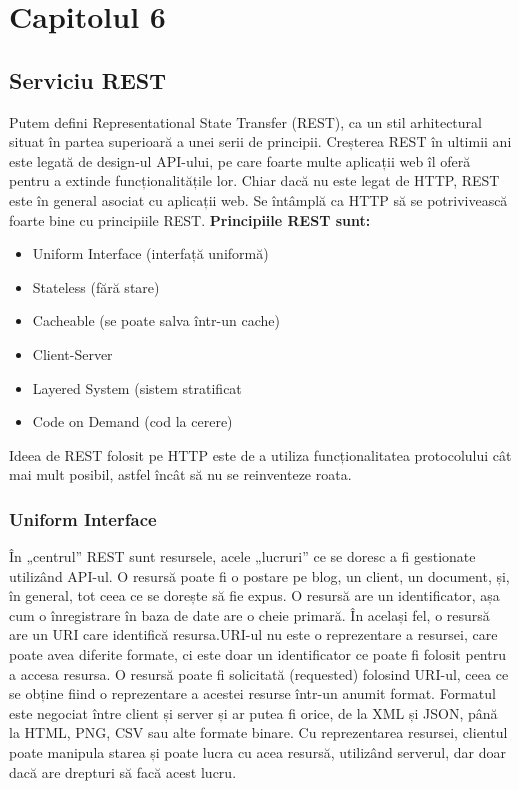 \chapter{Capitolul 6}
\section{Serviciu REST}

Putem defini Representational State Transfer (REST), ca un stil arhitectural situat în partea superioară a unei serii de principii. Creșterea REST în ultimii ani este legată de design-ul API-ului, pe care foarte multe aplicații web îl oferă pentru a extinde funcționalitățile lor. Chiar dacă nu este legat de HTTP, REST este în general asociat cu aplicații web. Se întâmplă ca HTTP să se potrivivească  foarte bine cu principiile REST.
\textbf{Principiile REST sunt:} 
\begin{itemize}
	\item Uniform Interface (interfață uniformă)
	\item  Stateless (fără stare)
	\item Cacheable (se poate salva într-un cache)
	\item Client-Server
	\item  Layered System (sistem stratificat
	\item Code on Demand (cod la cerere)
\end{itemize}

Ideea de REST folosit pe HTTP este de a utiliza funcționalitatea protocolului cât mai mult posibil, astfel încât să nu se reinventeze roata.
\subsection{Uniform Interface}
În „centrul” REST sunt resursele, acele „lucruri” ce se doresc a fi gestionate utilizând API-ul. O resursă poate fi o postare pe blog, un client, un document, și, în general, tot ceea ce se dorește să fie expus. O resursă are un identificator, așa cum o înregistrare în baza de date are o cheie primară. În același fel, o resursă are un URI care identifică resursa.URI-ul nu este o reprezentare a resursei, care poate avea diferite formate, ci este doar un identificator ce poate fi folosit pentru a accesa resursa.
O resursă poate fi solicitată (requested) folosind URI-ul, ceea ce se obține fiind o reprezentare a acestei resurse într-un anumit format. Formatul este negociat între client și server și ar putea fi orice, de la XML și JSON, până la HTML, PNG, CSV sau alte formate binare. Cu reprezentarea resursei, clientul poate manipula starea și poate lucra cu acea resursă, utilizând serverul, dar doar dacă are drepturi să facă acest lucru.
